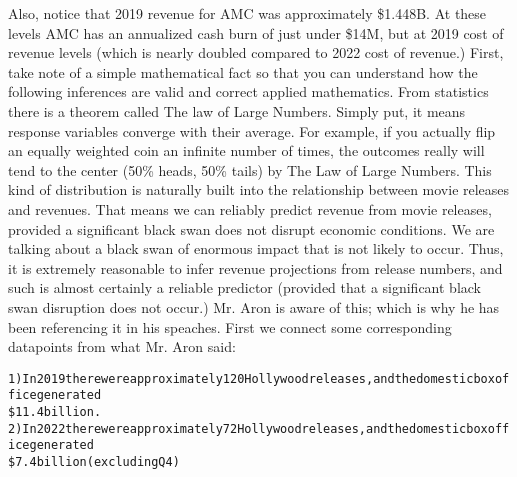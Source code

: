 \documentclass{article}
\begin{document}
Also, notice that 2019 revenue for AMC was approximately \$1.448B. At these levels 
AMC has an annualized cash burn of just under \$14M, but at 2019 cost of revenue 
levels (which is nearly doubled compared to 2022 cost of revenue.)
\newline \newline
First, take note of a simple mathematical fact so that you can understand how 
the following inferences are valid and correct applied mathematics. From 
statistics there is a theorem called The law of Large Numbers. Simply put, it means 
response variables converge with their average. For example, if you actually flip an 
equally weighted coin an infinite number of times, the outcomes really will tend to 
the center (50\% heads, 50\% tails) by The Law of Large Numbers. This kind of 
distribution is naturally built into the relationship between movie releases and 
revenues. That means we can reliably predict revenue from movie releases, provided 
a significant black swan does not disrupt economic conditions. We are talking about 
a black swan of enormous impact that is not likely to occur. Thus, it is extremely 
reasonable to infer revenue projections from release numbers, and such is almost 
certainly a reliable predictor (provided that a significant black swan disruption 
does not occur.) Mr. Aron is aware of this; which is why he has been referencing 
it in his speaches.
\newline \newline
First we connect some corresponding datapoints from what Mr. Aron said:
\begin{alltt}
1) In 2019 there were approximately 120 Hollywood releases, and the domestic box office generated 
   \$11.4 billion.
2) In 2022 there were approximately 72 Hollywood releases, and the domestic box office generated 
   \$7.4 billion (excluding Q4)
\end{alltt}
\end{document}
